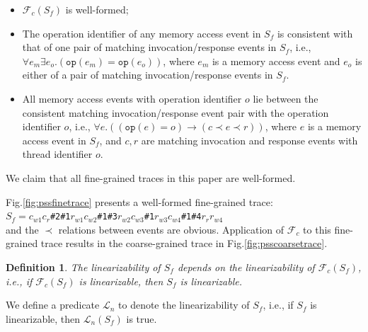 \documentclass[runningheads]{llncs}
\newcommand{\ecall}{\mathsf{C}}
\newcommand{\eresp}{\mathsf{R}}
\newtheorem{myDef}{Definition}
\begin{document}

\begin{itemize}
  \item $\mathcal{F}_c(S_f)$ is well-formed;
  \item The operation identifier of any memory access event in $S_f$ is consistent with that of one pair of  matching invocation/response events  in $S_f$, i.e.,
      $\forall e_m\exists e_o.(\mathtt{op}(e_m)= \mathtt{op}(e_o))$, where $e_m$ is a memory access event and $e_o$ is either of a pair of matching invocation/response events in $S_f$.
  \item All memory access events with operation identifier $o$ lie between the consistent matching invocation/response event pair with the operation identifier $o$, i.e.,
      $\forall e.((\mathtt{op}(e)=o)\to(c\prec e\prec r))$, where $e$ is a memory access event in $S_f$, and $c,r$ are matching invocation and response events with thread identifier $o$.
\end{itemize}
\noindent We claim that all fine-grained traces in this paper are well-formed.

%


\begin{example}
Fig.\ref{fig:pssfinetrace} presents a well-formed fine-grained trace:\\
 \quad\quad\quad\quad$S_f = c_{w1}c_r$\texttt{\#2\#1}$r_{w1}c_{w2}$\texttt{\#1\#3}$r_{w2}c_{w3}$\texttt{\#1}$r_{w3}c_{w4}$\texttt{\#1\#4}$r_{r}r_{w4}$\\
and the $\prec$ relations between events are obvious. 
Application of $\mathcal{F}_{c}$ to this fine-grained trace results in the coarse-grained trace in Fig.\ref{fig:psscoarsetrace}.
\end{example}

\begin{myDef}
The linearizability of $S_f$ depends on the linearizability of $\mathcal{F}_c(S_f)$, i.e., if $\mathcal{F}_c(S_f)$ is linearizable, then $S_f$ is linearizable. \end{myDef}

We define a predicate $\mathcal{L}_n$ to denote the linearizability of $S_f$, i.e., if $S_f$ is linearizable, then $\mathcal{L}_n(S_f)$ is true.
\end{document}
